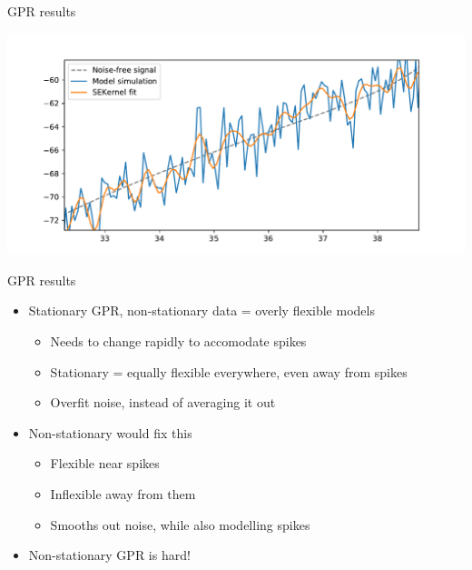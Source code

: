 \documentclass[presentation]{beamer}
\begin{document}
\begin{frame}[label={sec:org555f6e7}]{GPR results}
\begin{center}
\includegraphics[width=.9\linewidth]{./badfit2.pdf}
\end{center}
\end{frame}

\begin{frame}[<+->][label={sec:org97e1898}]{GPR results}
\begin{itemize}
\item Stationary GPR, non-stationary data = overly flexible models
\begin{itemize}
\item Needs to change rapidly to accomodate spikes
\item Stationary = equally flexible everywhere, even away from spikes
\item Overfit noise, instead of averaging it out
\end{itemize}
\item Non-stationary would fix this
\begin{itemize}
\item Flexible near spikes
\item Inflexible away from them
\item Smooths out noise, while also modelling spikes
\end{itemize}
\item Non-stationary GPR is hard!
\end{itemize}
\end{frame}
\end{document}
